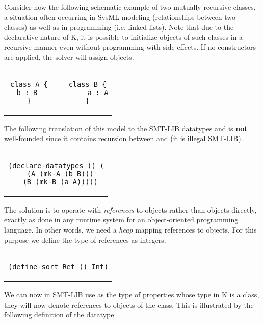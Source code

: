 Consider now the following schematic example of two mutually recursive
classes, a situation often occurring in SysML modeling (relationships
between two classes) as well as in programming (i.e. linked lists).
Note that due to the declarative nature of K, it is possible to initialize
objects of such classes in a recursive manner even without programming with side-effects.
If no constructors are applied, the solver will assign objects.

\lstset{language=K,numbers=none}

\begin{center}
\begin{tabular}{c}
\small
\begin{lstlisting}
class A {     class B {
  b : B            a : A
}             }
\end{lstlisting}
\end{tabular}
\end{center}

\noindent The following translation of this model to the SMT-LIB
datatypes  and  is {\bf not} well-founded since it
contains recursion between  and  (it is illegal
SMT-LIB).

\lstset{language=SMT,numbers=none}

\begin{center}
\begin{tabular}{c}
\small
\begin{lstlisting}
(declare-datatypes () (
  (A (mk-A (b B)))
  (B (mk-B (a A)))))
\end{lstlisting}
\end{tabular}
\end{center}

\noindent The solution is to operate with {\em references} to objects rather
than objects directly, exactly as done in any runtime system for an
object-oriented programming language. In other words, we need a {\em
  heap} mapping references to objects. For this purpose we define
the type of references as integers.

\begin{center}
\begin{tabular}{c}
\small
\begin{lstlisting}
(define-sort Ref () Int)
\end{lstlisting}
\end{tabular}
\end{center}

\noindent We can now in SMT-LIB use  as the type of properties whose 
type in K is a class, they will now denote references to objects of the class.
This is illustrated by the following definition of the  datatype.

